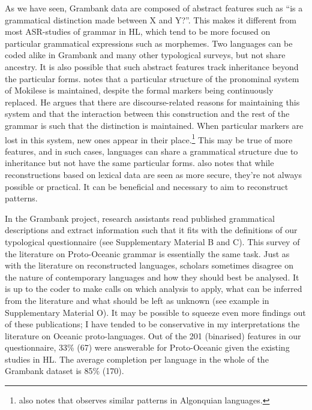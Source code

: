 \documentclass[12pt,letterpaper]{article}
\begin{document}
As we have seen, Grambank data are composed of abstract features such as ``is a grammatical distinction made between X and Y?''. This makes it different from most ASR-studies of grammar in HL, which tend to be more focused on particular grammatical expressions such as morphemes. Two languages can be coded alike in Grambank and many other typological surveys, but not share ancestry. It is also possible that such abstract features track inheritance beyond the particular forms. \citet[503]{ross2004morphosyntactic} notes that a particular structure of the pronominal system of Mokilese is maintained, despite the formal markers being continuously replaced. He argues that there are discourse-related reasons for maintaining this system and that the interaction between this construction and the rest of the grammar is such that the distinction is maintained. When particular markers are lost in this system, new ones appear in their place.\footnote{\citet{ross2004morphosyntactic} also notes that \citet{goddard1993algonquian} observes similar patterns in Algonquian languages.} This may be true of more features, and in such cases, languages can share a grammatical structure due to inheritance but not have the same particular forms. \citet[400--401]{evans2003study} also notes that while reconstructions based on lexical data are seen as more secure, they're not always possible or practical. It can be beneficial and necessary to aim to reconstruct patterns. %

In the Grambank project, research assistants read published grammatical descriptions and extract information such that it fits with the definitions of our typological questionnaire (see Supplementary Material B and C). This survey of the literature on Proto-Oceanic grammar is essentially the same task. Just as with the literature on reconstructed languages, scholars sometimes disagree on the nature of contemporary languages and how they should best be analysed. It is up to the coder to make calls on which analysis to apply, what can be inferred from the literature and what should be left as unknown (see example in Supplementary Material O). It may be possible to squeeze even more findings out of these publications; I have tended to be conservative in my interpretations the literature on Oceanic proto-languages. Out of the 201 (binarised) features in our questionnaire, 33\% (67) were answerable for Proto-Oceanic given the existing studies in HL. The average completion per language in the whole of the Grambank dataset is 85\% (170). 
\end{document}
